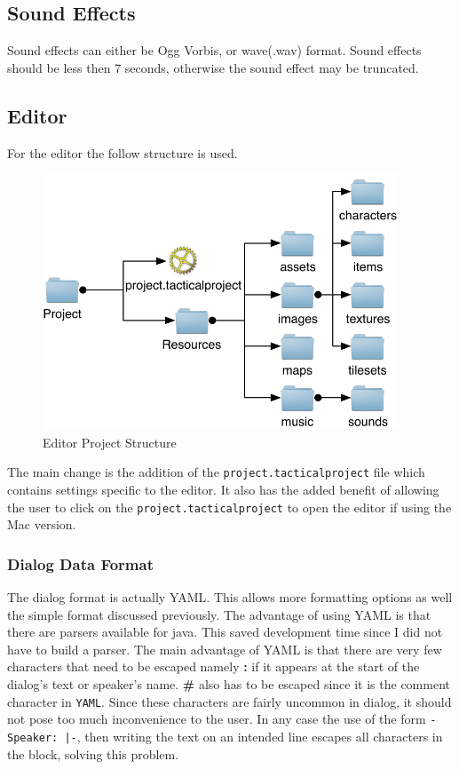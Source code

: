 \subsection{Sound Effects}
Sound effects can either be Ogg Vorbis, or wave(.wav) format. Sound effects should be less then 7 seconds, otherwise the sound effect may be truncated. 

\clearpage
\subsection{Editor}
For the editor the follow structure is used.

\begin{figure}[htbp]
	\centering
		\includegraphics[height=3in]{figures/project.pdf}
	\caption{Editor Project Structure}
	\label{fig:figures_project}
\end{figure}

The main change is the addition of the \texttt{project.tacticalproject} file which contains settings specific to the editor. It also has the added benefit of allowing the user to click on the \texttt{project.tacticalproject} to open the editor if using the Mac version.

\subsubsection{Dialog Data Format}
\label{ssub:dialog_data_format}

The dialog format is actually YAML\cite{yaml}. This allows more formatting options as well the simple format discussed previously. The advantage of using YAML is that there are parsers available for java\cite{snake}. This saved development time since I did not have to build a parser. The main advantage of YAML is that there are very few characters that need to be escaped namely \textbf{:} if it appears at the start of the dialog's text or speaker's name. \textbf{\#} also has to be escaped since it is the comment character in \texttt{YAML}. Since these characters are fairly uncommon in dialog, it should not pose too much inconvenience to the user. In any case the use  of the form \texttt{- Speaker: |-}, then  writing the text on an intended line escapes all characters in the block, solving this problem.

